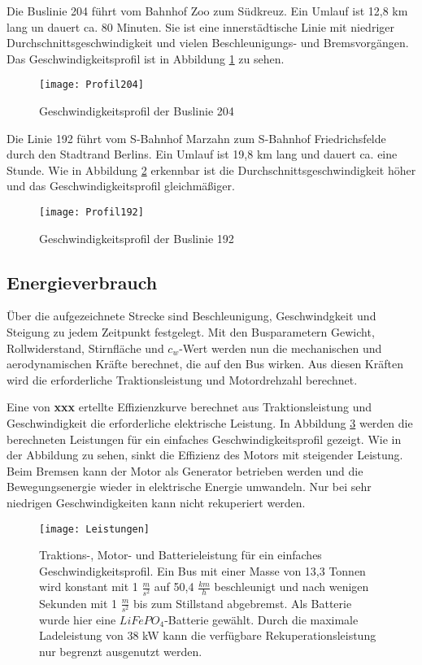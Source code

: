 Die Buslinie 204 führt vom Bahnhof Zoo zum Südkreuz. Ein Umlauf ist 12,8 km lang un dauert ca. 80 Minuten. Sie ist eine innerstädtische Linie mit niedriger Durchschnittsgeschwindigkeit und vielen Beschleunigungs- und Bremsvorgängen. Das Geschwindigkeitsprofil ist in Abbildung \ref{Abb_204} zu sehen.
\begin{figure}\centering
	\texttt{[image: Profil204]}
	\caption{Geschwindigkeitsprofil der Buslinie 204}
	\label{Abb_204}
\end{figure}

Die Linie 192 führt vom S-Bahnhof Marzahn zum S-Bahnhof Friedrichsfelde durch den Stadtrand Berlins. Ein Umlauf ist 19,8 km lang und dauert ca. eine Stunde. Wie in Abbildung \ref{Abb_192} erkennbar ist die Durchschnittsgeschwindigkeit höher und das Geschwindigkeitsprofil gleichmäßiger.

\begin{figure}\centering
	\texttt{[image: Profil192]}
	\caption{Geschwindigkeitsprofil der Buslinie 192}
	\label{Abb_192}
\end{figure}

\subsection{Energieverbrauch}
Über die aufgezeichnete Strecke sind Beschleunigung, Geschwindgkeit und Steigung zu jedem Zeitpunkt festgelegt. Mit den Busparametern Gewicht, Rollwiderstand, Stirnfläche und $c_w$-Wert werden nun die mechanischen und aerodynamischen Kräfte berechnet, die auf den Bus wirken. Aus diesen Kräften wird die erforderliche Traktionsleistung und Motordrehzahl berechnet.

Eine von \textbf{xxx} ertellte Effizienzkurve berechnet aus Traktionsleistung und Geschwindigkeit die erforderliche elektrische Leistung. In Abbildung \ref{abb_Leistungen} werden die berechneten Leistungen für ein einfaches Geschwindigkeitsprofil gezeigt. Wie in der Abbildung zu sehen, sinkt die Effizienz des Motors mit steigender Leistung. Beim Bremsen kann der Motor als Generator betrieben werden und die Bewegungsenergie wieder in elektrische Energie umwandeln. Nur bei sehr niedrigen Geschwindigkeiten kann nicht rekuperiert werden.
\begin{figure}\centering
	\texttt{[image: Leistungen]}
	\caption[Traktions-, Motor- und Batterieleistung für ein einfaches Geschwindigkeitsprofil]{Traktions-, Motor- und Batterieleistung für ein einfaches Geschwindigkeitsprofil. Ein Bus mit einer Masse von 13,3 Tonnen wird konstant mit 1 $\frac{m}{s^2}$ auf 50,4 $\frac{km}{h}$ beschleunigt und nach wenigen Sekunden mit 1 $\frac{m}{s^2}$ bis zum Stillstand abgebremst. Als Batterie wurde hier eine $LiFePO_4$-Batterie gewählt. Durch die maximale Ladeleistung von 38 kW kann die verfügbare Rekuperationsleistung nur begrenzt ausgenutzt werden.}
	\label{abb_Leistungen}
\end{figure}

